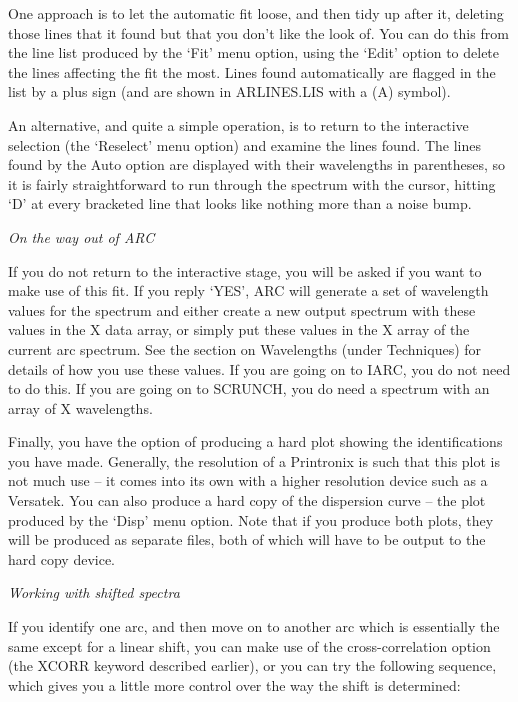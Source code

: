 One approach is to let the
automatic fit loose, and then tidy up after it, deleting those lines that it
found but that you don't like the look of.  You can do this from the
line list produced by the `Fit' menu option, using the `Edit' option to 
delete the lines affecting the fit the most.  Lines found automatically
are flagged in the list by a plus sign (and are shown in ARLINES.LIS with
a (A) symbol).

An alternative, and quite a
simple operation, is to return to the interactive selection (the `Reselect'
menu option) and examine the lines found.  The lines found by the Auto
option are displayed with their wavelengths in parentheses, so it is fairly
straightforward to run through the spectrum with the cursor, hitting `D'
at every bracketed line that looks like nothing more than a noise bump.


\goodbreak
\vspace{12pt}
{\it On the way out of ARC}

If you do not return to the interactive stage, you will be asked if
you want to make use of this fit.  If you reply `YES', ARC will generate
a set of wavelength values for the spectrum and either create a new output
spectrum with these values in the X data array, or simply put these values
in the X array of the current arc spectrum.  See the section on Wavelengths
(under Techniques) for details of how you use these values.  If you are going
on to IARC, you do not need to do this.  If you are going on to SCRUNCH,
you do need a spectrum with an array of X wavelengths.

Finally, you have the option of producing a hard plot showing the
identifications you have made.  Generally, the resolution of a Printronix
is such that this plot is not much use -- it comes into its own with a
higher resolution device such as a Versatek.  You can also produce a hard
copy of the dispersion curve -- the plot produced by the `Disp' menu option.
Note that if you produce both plots, they will be produced as separate
files, both of which will have to be output to the hard copy device.


\goodbreak
\vspace{12pt}
{\it Working with shifted spectra}

If you identify one arc, and then move on to another arc which is
essentially the same except for a linear shift, you can make use of
the cross-correlation option (the XCORR keyword described earlier), or
you can try the following sequence, which gives you a little more
control over the way the shift is determined:

